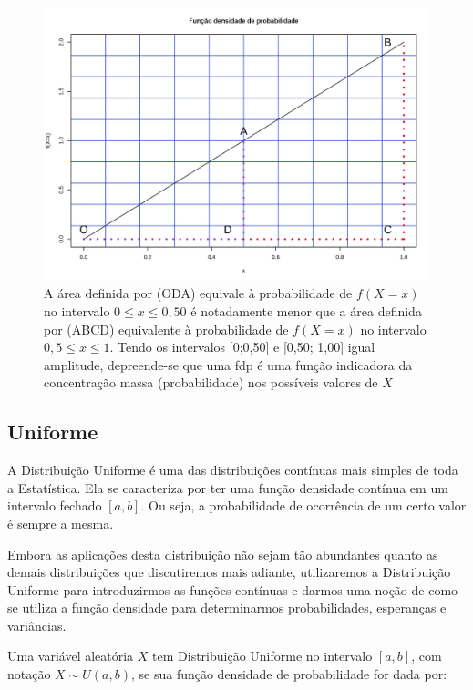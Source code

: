 \documentclass[
]{book}
\begin{document}
\hfill\break

\begin{figure}

{\centering \includegraphics[width=0.6\linewidth]{images6/massa} 

}

\caption{A área definida por (ODA) equivale à probabilidade de $f(X=x)$ no intervalo $0 \le x \le 0,50$ é notadamente menor que a área definida por (ABCD) equivalente à probabilidade de $f(X=x)$ no intervalo $0,5 \le x \le 1$. Tendo os intervalos [0;0,50] e [0,50; 1,00] igual amplitude, depreende-se que uma fdp é uma função indicadora da concentração massa (probabilidade) nos possíveis valores de $X$}\label{fig:fig15}
\end{figure}

\hypertarget{uniforme}{%
\subsection{Uniforme}\label{uniforme}}

\hfill\break

A Distribuição Uniforme é uma das distribuições contínuas mais simples de toda a Estatística. Ela se caracteriza por ter uma função densidade contínua em um intervalo fechado \([a,b]\). Ou seja, a probabilidade de ocorrência de um certo valor é sempre a mesma.

\hfill\break

Embora as aplicações desta distribuição não sejam tão abundantes quanto as demais distribuições que discutiremos mais adiante, utilizaremos a Distribuição Uniforme para introduzirmos as funções contínuas e darmos uma noção de como se utiliza a função densidade para determinarmos probabilidades, esperanças e variâncias.

\hfill\break

Uma variável aleatória \(X\) tem Distribuição Uniforme no intervalo \([a,b]\), com notação \(X \sim U (a, b)\), se sua função densidade de probabilidade for dada por:
\end{document}
